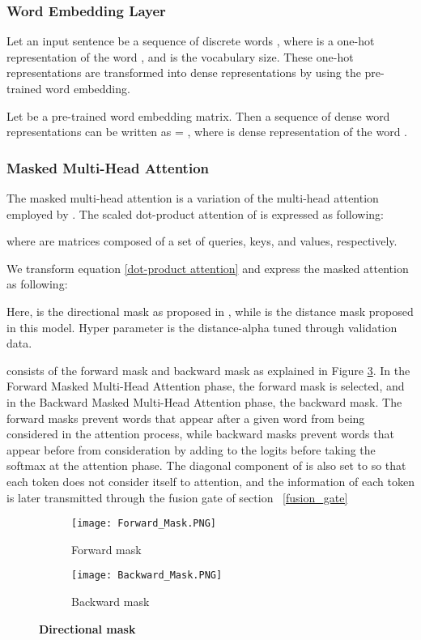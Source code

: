 \documentclass[11pt,letterpaper]{article}
\begin{document}
\subsubsection{Word Embedding Layer}

Let an input sentence be a sequence of discrete words , where  is a one-hot representation of the word , and  is the vocabulary size. These one-hot representations are transformed into dense representations by using the pre-trained word embedding.

Let  be a pre-trained word embedding matrix. Then a sequence of dense word representations can be written as  = , where  is dense representation of the word .

\subsubsection{Masked Multi-Head Attention}

The masked multi-head attention is a variation of the multi-head attention employed by \citet{AttentionAYN}. The scaled dot-product attention of \citet{AttentionAYN} is expressed as following:


where  are matrices composed of a set of queries, keys, and values, respectively.

We transform equation \ref{dot-product attention} and express the masked attention as following:



Here,  is the directional mask as proposed in \citet{DiSAN}, while  is the distance mask proposed in this model. Hyper parameter  is the distance-alpha tuned through validation data.

 consists of the forward mask and backward mask as explained in Figure \ref{Directional_mask}. In the Forward Masked Multi-Head Attention phase, the forward mask is selected, and in the Backward Masked Multi-Head Attention phase, the backward mask. The forward masks prevent words that appear after a given word from being considered in the attention process, while backward masks prevent words that appear before from consideration by adding  to the logits before taking the softmax at the attention phase. The diagonal component of  is also set to  so that each token does not consider itself to attention, and the information of each token is later transmitted through the fusion gate of section ~\ref{fusion_gate}

\begin{figure}[h]
\centering
\begin{subfigure}{.2\textwidth}
  \centering
  \texttt{[image: Forward\_Mask.PNG]}
  \caption{Forward mask}
  \label{Forward_mask}
\end{subfigure}\hspace{.5em}
\begin{subfigure}{.2\textwidth}
  \centering
  \texttt{[image: Backward\_Mask.PNG]}
  \caption{Backward mask}
  \label{Backward_mask}
\end{subfigure}
\caption{\textbf{Directional mask}}
\label{Directional_mask}
\end{figure}
\end{document}
